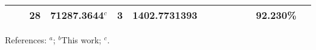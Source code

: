 \begin{table*}
\begin{center}
{\begin{tabular}{:l;l;c;l;c;l;c;l;l;c;c;c;c}
\rowstyle{\itshape}               &        & 28        & 71287.3644$^{c}$                 & 3 &  1402.7731393      &      & $                                        $ & $                                        $ & $      $ &              & 92.230\%  & $          $\\
\hline
\end{tabular}
}
{\footnotesize References:
$^{a}$\citet{Griesmann:2000:L113};
$^{b}$This work;
$^{c}$\citet{Berengut:2003:022502}.}
\end{center}
\end{table*}
